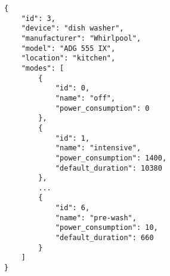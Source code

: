 \begin{lstlisting}[language=numbered,caption={JSON file describing the dish washer},label=code:appliance_dish_washer,float,floatplacement=H]
{
	"id": 3,
	"device": "dish washer",
	"manufacturer": "Whirlpool",
	"model": "ADG 555 IX",
	"location": "kitchen",
	"modes": [
		{
			"id": 0,
			"name": "off",
			"power_consumption": 0
		},
		{
			"id": 1,
			"name": "intensive",
			"power_consumption": 1400,
			"default_duration": 10380
		},
		...	
		{
			"id": 6,
			"name": "pre-wash",
			"power_consumption": 10,
			"default_duration": 660
		}
	]
}
\end{lstlisting}
